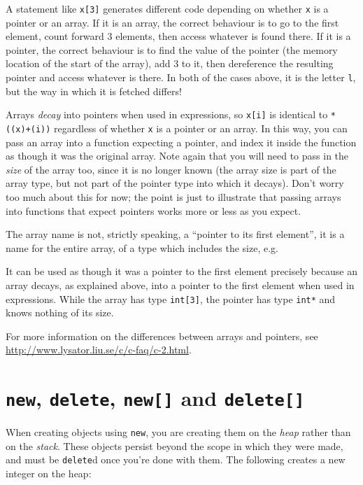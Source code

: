 \documentclass[a4paper]{scrartcl}
\begin{document}
A statement like \verb|x[3]| generates different code depending on whether \verb|x| is a pointer or an array. If it is an array, the correct behaviour is to go to the first element, count forward $3$ elements, then access whatever is found there. If it is a pointer, the correct behaviour is to find the value of the pointer (the memory location of the start of the array), add $3$ to it, then dereference the resulting pointer and access whatever is there. In both of the cases above, it is the letter \verb|l|, but the way in which it is fetched differs!

Arrays \emph{decay} into pointers when used in expressions, so \verb|x[i]| is identical to \verb|*((x)+(i))| regardless of whether \verb|x| is a pointer or an array. In this way, you can pass an array into a function expecting a pointer, and index it inside the function as though it was the original array. Note again that you will need to pass in the \emph{size} of the array too, since it is no longer known (the array size is part of the array type, but not part of the pointer type into which it decays). Don't worry too much about this for now; the point is just to illustrate that passing arrays into functions that expect pointers works more or less as you expect.

The array name is not, strictly speaking, a ``pointer to its first element'', it is a name for the entire array, of a type which includes the size, e.g.



It can be used as though it was a pointer to the first element precisely because an array decays, as explained above, into a pointer to the first element when used in expressions. While the array has type \verb|int[3]|, the pointer has type \verb|int*| and knows nothing of its size.

For more information on the differences between arrays and pointers, see \url{http://www.lysator.liu.se/c/c-faq/c-2.html}.

\section{\texttt{new}, \texttt{delete}, \texttt{new[]} and \texttt{delete[]}}
When creating objects using \verb|new|, you are creating them on the \emph{heap} rather than on the \emph{stack}. These objects persist beyond the scope in which they were made, and must be \verb|delete|d once you're done with them. The following creates a new integer on the heap:
\end{document}
